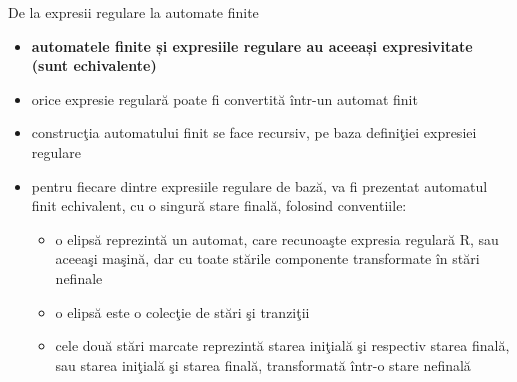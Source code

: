 \documentclass[pdf]{beamer}
\begin{document}
\begin{frame}{De la expresii regulare la automate finite }
\begin{itemize}
\item
\textbf{automatele finite și expresiile regulare au aceeași expresivitate (sunt echivalente)}
\item
orice expresie regulară poate fi convertită într-un automat finit
\item
construcţia automatului finit se face recursiv, pe baza definiţiei expresiei regulare
\item
pentru fiecare dintre expresiile regulare de bază, va fi prezentat automatul finit echivalent, cu o singură stare finală, folosind conventiile:
\begin{itemize}
\item
o elipsă reprezintă un automat, care recunoaşte expresia regulară R, sau aceeaşi maşină, dar cu toate stările componente transformate în stări nefinale
\item
o elipsă este o colecţie de stări şi tranziţii
\item
cele două stări marcate reprezintă starea iniţială şi respectiv starea finală, sau starea iniţială şi starea finală, transformată într-o stare nefinală
\end{itemize}
\end{itemize}
\end{frame}
\end{document}
